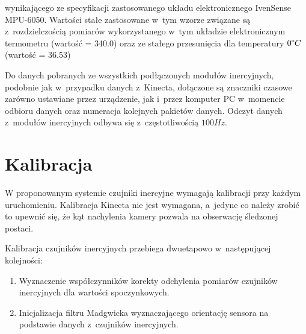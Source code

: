 wynikającego ze specyfikacji zastosowanego układu elektronicznego IvenSense MPU-6050. Wartości stałe zastosowane w~tym wzorze związane są z~rozdzielczością pomiarów wykorzystanego w~tym układzie elektronicznym termometru (wartość = 340.0) oraz ze stałego przesunięcia dla temperatury $0 \degree C$ (wartość = 36.53)
				
Do danych pobranych ze wszystkich podłączonych modułów inercyjnych, podobnie jak w~przypadku danych z~Kinecta, dołączone są znaczniki czasowe zarówno ustawiane przez urządzenie, jak i~przez komputer PC w~momencie odbioru danych oraz numeracja kolejnych pakietów danych. Odczyt danych z~modułów inercyjnych odbywa się z~częstotliwością $100Hz$.
		
\section{Kalibracja}
W proponowanym systemie czujniki inercyjne wymagają kalibracji przy każdym uruchomieniu. Kalibracja Kinecta nie jest wymagana, a~jedyne co należy zrobić to upewnić się, że kąt nachylenia kamery pozwala na obserwację śledzonej postaci.
		
Kalibracja czujników inercyjnych przebiega dwuetapowo w~następującej kolejności:
\begin{enumerate}
	\item {Wyznaczenie współczynników korekty odchylenia pomiarów czujników inercyjnych dla wartości spoczynkowych.} 
	\item {Inicjalizacja filtru Madgwicka wyznaczającego orientację sensora na podstawie danych z~czujników inercyjnych.}
\end{enumerate}
		
